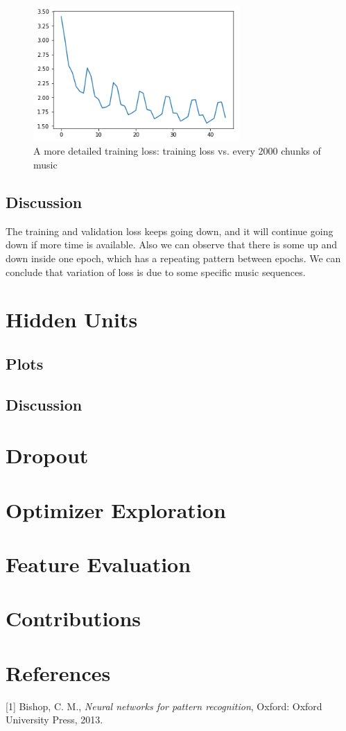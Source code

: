 \documentclass{article}
\begin{document}
\begin{figure}[h]
\centering
\includegraphics[width=0.7\textwidth]{pics/every_2000_train_loss.png}
\caption{A more detailed training loss: training loss vs. every 2000 chunks of music}
\end{figure}
\subsection{Discussion}
The training and validation loss keeps going down, and it will continue going down if more time is available. Also we can observe that there is some up and down inside one epoch, which has a repeating pattern between epochs. We can conclude that variation of loss is due to some specific music sequences.  
\newpage


\section{Hidden Units}
\subsection{Plots}
\subsection{Discussion}

\section{Dropout}

\section{Optimizer Exploration}

\section{Feature Evaluation}

\section{Contributions}



\section{References}
[1] Bishop, C. M., {\it Neural networks for pattern recognition}, Oxford: Oxford University Press, 2013. \\
\end{document}
